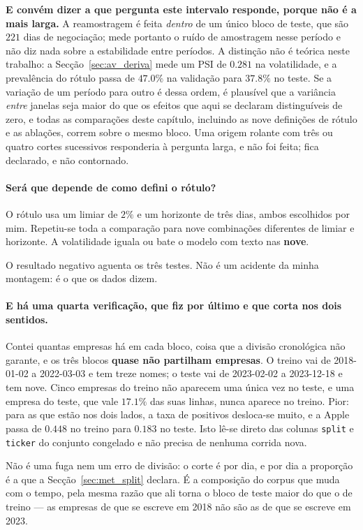 \textbf{E convém dizer a que pergunta este intervalo responde, porque não é a mais larga.} A
reamostragem é feita \emph{dentro} de um único bloco de teste, que são $221$ dias de negociação;
mede portanto o ruído de amostragem nesse período e não diz nada sobre a estabilidade entre
períodos. A distinção não é teórica neste trabalho: a Secção~\ref{sec:av_deriva} mede um
\gls{PSI} de $0.281$ na volatilidade, e a prevalência do rótulo passa de $47.0\%$ na validação
para $37.8\%$ no teste. Se a variação de um período para outro é dessa ordem, é plausível que a
variância \emph{entre} janelas seja maior do que os efeitos que aqui se declaram distinguíveis de
zero, e todas as comparações deste capítulo, incluindo as nove definições de rótulo e as
ablações, correm sobre o mesmo bloco. Uma origem rolante com três ou quatro cortes sucessivos
responderia à pergunta larga, e não foi feita; fica declarado, e não contornado.

\paragraph{Será que depende de como defini o rótulo?} O rótulo usa um limiar de $2\%$ e um horizonte
de três dias, ambos escolhidos por mim. Repetiu-se toda a comparação para nove combinações
diferentes de limiar e horizonte. A volatilidade iguala ou bate o modelo com texto nas
\textbf{nove}.

O resultado negativo aguenta os três testes. Não é um acidente da minha montagem: é o que os dados dizem.

\paragraph{E há uma quarta verificação, que fiz por último e que corta nos dois sentidos.}
Contei quantas empresas há em cada bloco, coisa que a divisão cronológica não garante, e os três
blocos \textbf{quase não partilham empresas}. O treino vai de 2018-01-02 a 2022-03-03 e tem treze
nomes; o teste vai de 2023-02-02 a 2023-12-18 e tem nove. Cinco empresas do treino não aparecem
uma única vez no teste, e uma empresa do teste, que vale $17.1\%$ das suas linhas, nunca aparece
no treino. Pior: para as que estão nos dois lados, a taxa de positivos desloca-se muito, e a
Apple passa de $0.448$ no treino para $0.183$ no teste. Isto lê-se direto das colunas
\texttt{split} e \texttt{ticker} do conjunto congelado e não precisa de nenhuma corrida nova.

Não é uma fuga nem um erro de divisão: o corte é por dia, e por dia a proporção é a que a
Secção~\ref{sec:met_split} declara. É a composição do corpus que muda com o tempo, pela mesma razão
que ali torna o bloco de teste maior do que o de treino --- as empresas de que se escreve em 2018
não são as de que se escreve em 2023.


